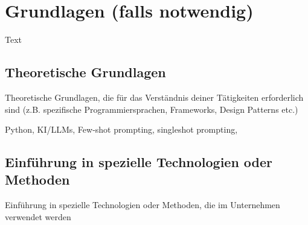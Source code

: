 \chapter{Grundlagen (falls notwendig)}
Text 

\section{Theoretische Grundlagen}
Theoretische Grundlagen, die für das Verständnis deiner Tätigkeiten erforderlich sind (z.B. spezifische Programmiersprachen, Frameworks, Design Patterns etc.)

Python, KI/LLMs, Few-shot prompting, singleshot prompting, 

\section{Einführung in spezielle Technologien oder Methoden}
Einführung in spezielle Technologien oder Methoden, die im Unternehmen verwendet werden


